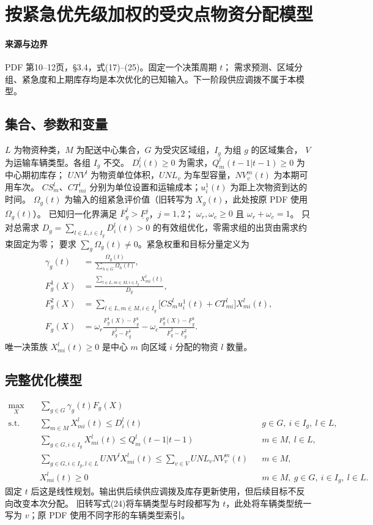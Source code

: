 \documentclass[UTF8,11pt]{ctexart}
\begin{document}
\section*{按紧急优先级加权的受灾点物资分配模型}

\paragraph{来源与边界} PDF 第10--12页，§3.4，式(17)--(25)。固定一个决策周期 $t$；
需求预测、区域分组、紧急度和上期库存均是本次优化的已知输入。下一阶段供应调拨不属于本模型。
\subsection*{集合、参数和变量}
$L$ 为物资种类，$M$ 为配送中心集合，$G$ 为受灾区域组，$I_g$ 为组 $g$ 的区域集合，
$V$ 为运输车辆类型。各组 $I_g$ 不交。
$D_i^l(t)\ge0$ 为需求，$Q_m^l(t-1|t-1)\ge0$ 为中心期初库存；
$UNV^l$ 为物资单位体积，$UNL_v$ 为车型容量，$NV_v^m(t)$ 为本期可用车次。
$CS_m^l$、$CT_{mi}^l$ 分别为单位设置和运输成本；$u_i^1(t)$ 为距上次物资到达的时间。
$\Omega_g(t)$ 为输入的组紧急评价值（旧转写为 $X_g(t)$，此处按原 PDF 使用 $\Omega_g(t)$）。
已知归一化界满足 $\overline F_g^j>\underline F_g^j$，$j=1,2$；
$\omega_r,\omega_c\ge0$ 且 $\omega_r+\omega_c=1$。
只对总需求 $D_g=\sum_{l\in L,i\in I_g}D_i^l(t)>0$ 的有效组优化，零需求组的出货由需求约束固定为零；
要求 $\sum_g\Omega_g(t)\ne0$。紧急权重和目标分量定义为
\begin{align}
\gamma_g(t)&=\frac{\Omega_g(t)}{\sum_{h\in G}\Omega_h(t)},\\
F_g^1(X)&=\frac{\sum_{l\in L,m\in M,i\in I_g}X_{mi}^l(t)}{D_g},\\
F_g^2(X)&=\sum_{l\in L,m\in M,i\in I_g}
  \bigl[CS_m^l u_i^1(t)+CT_{mi}^l\bigr]X_{mi}^l(t),\\
F_g(X)&=\omega_r\frac{F_g^1(X)-\underline F_g^1}{\overline F_g^1-\underline F_g^1}
-\omega_c\frac{F_g^2(X)-\underline F_g^2}{\overline F_g^2-\underline F_g^2}.
\end{align}
唯一决策族 $X_{mi}^l(t)\ge0$ 是中心 $m$ 向区域 $i$ 分配的物资 $l$ 数量。
\subsection*{完整优化模型}
\begin{align}
\max_X\quad &\sum_{g\in G}\gamma_g(t)F_g(X)\tag{20}\\
\text{s.t.}\quad
&\sum_{m\in M}X_{mi}^l(t)\le D_i^l(t)
 &&g\in G,\ i\in I_g,\ l\in L,\tag{22}\\
&\sum_{g\in G,i\in I_g}X_{mi}^l(t)\le Q_m^l(t-1|t-1)
 &&m\in M,\ l\in L,\tag{23}\\
&\sum_{g\in G,i\in I_g,l\in L}UNV^lX_{mi}^l(t)
\le\sum_{v\in V}UNL_vNV_v^m(t) &&m\in M,\tag{24}\\
&X_{mi}^l(t)\ge0 &&m\in M,\ g\in G,\ i\in I_g,\ l\in L.\tag{25}
\end{align}
固定 $t$ 后这是线性规划。输出供后续供应调拨及库存更新使用，但后续目标不反向改变本次分配。
旧转写式(24)将车辆类型与时段都写为 $t$，此处将车辆类型统一写为 $v$；原 PDF 使用不同字形的车辆类型索引。
\end{document}
